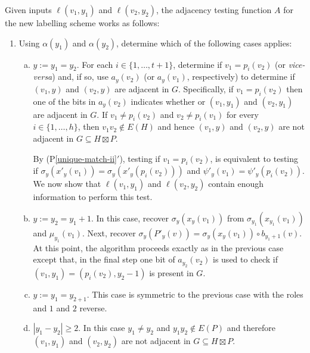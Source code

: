 \documentclass{patmorin}
\newcommand{\psref}[1]{(P\ref{#1}$'$)}
\begin{document}
Given inputs $\ell(v_1,y_1)$ and $\ell(v_2,y_2)$, the adjacency testing function $A$ for the new labelling scheme works as follows:
\begin{enumerate}
    \item Using $\alpha(y_1)$ and $\alpha(y_2)$, determine which of the following cases applies:
    \begin{enumerate}[(a)]
        \item $y:=y_1=y_2$.  For each $i\in\{1,\ldots,t+1\}$, determine if $v_1=p_i(v_2)$ (or \textit{vice-versa}) and, if so, use $a_y(v_2)$ (or $a_y(v_1)$, respectively) to determine if $(v_1,y)$ and $(v_2,y)$ are adjacent in $G$. Specifically, if $v_1=p_i(v_2)$ then one of the bits in $a_y(v_2)$ indicates whether or $(v_1,y_1)$ and $(v_2,y_1)$ are adjacent in $G$. If $v_1\neq p_i(v_2)$ and $v_2\neq p_i(v_1)$ for every $i\in\{1,\ldots,h\}$, then $v_1v_2\not\in E(H)$ and hence $(v_1,y)$ and $(v_2,y)$ are not adjacent in $G\subseteq H\boxtimes P$.

        By \psref{unique-match-ii}, testing if $v_1=p_i(v_2)$, is equivalent to testing if $\sigma_y(x'_y(v_1))=\sigma_y(x'_y(p_i(v_2)))$ and $\psi'_y(v_1)=\psi'_y(p_i(v_2))$. We now show that $\ell(v_1,y_1)$ and $\ell(v_2,y_2)$ contain enough information to perform this test.

        \item $y:=y_2=y_1+1$.  In this case, recover $\sigma_y(x_y(v_1))$ from $\sigma_{y_1}(x_{y_1}(v_1))$ and $\mu_{y_1}(v_1)$.  Next, recover $\sigma_y(P'_y(v))=\sigma_y(x_y(v_1))\mathbin{\circ}b_{y_1+1}(v)$. At this point, the algorithm proceeds exactly as in the previous case except that, in the final step one bit of $a_{y_2}(v_2)$ is used to check if $(v_1,y_1)=(p_i(v_2),y_2-1)$ is present in $G$.

        \item $y:=y_1=y_{2+1}$. This case is symmetric to the previous case with the roles and $1$ and $2$ reverse.

        \item $|y_1-y_2|\ge 2$.  In this case $y_1\neq y_2$ and $y_1y_2\not\in E(P)$ and therefore $(v_1,y_1)$ and $(v_2,y_2)$ are not adjacent in $G\subseteq H\boxtimes P$.
    \end{enumerate}
\end{enumerate}
\end{document}
